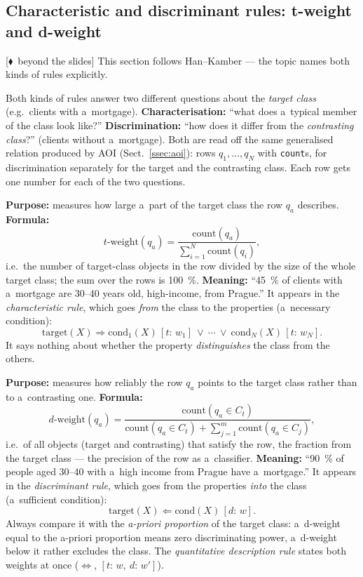 \documentclass[11pt,a4paper]{article}
\theoremstyle{definition}
\providecommand{\uv}[1]{``#1''}
\newcommand{\mimo}{\textcolor{markcol}{\textsf{\footnotesize[$\blacklozenge$~beyond the slides]}}}
\begin{document}
\subsection{Characteristic and discriminant rules: t-weight and d-weight}
\label{ssec:char-diskr}

\mimo{} This section follows Han--Kamber --- the topic names both kinds of rules
explicitly.

Both kinds of rules answer two different questions about the \emph{target class} (e.g.\
clients with a~mortgage). \textbf{Characterisation:} \uv{what does a~typical member of
the class look like?} \textbf{Discrimination:} \uv{how does it differ from the
\emph{contrasting class}?} (clients without a~mortgage). Both are read off the same
generalised relation produced by AOI (Sect.~\ref{ssec:aoi}): rows $q_1,\dots,q_N$ with
\texttt{count}s, for discrimination separately for the target and the contrasting class.
Each row gets one number for each of the two questions.

\begin{defbox}
\textbf{Purpose:} measures how large a~part of the target class the row $q_a$ describes.
\textbf{Formula:}
\[ t\text{-}\mathrm{weight}(q_a)=\frac{\mathrm{count}(q_a)}
   {\sum_{i=1}^{N}\mathrm{count}(q_i)}, \]
i.e.\ the number of target-class objects in the row divided by the size of the whole
target class; the sum over the rows is 100~\%. \textbf{Meaning:} \uv{45~\% of clients
with a~mortgage are 30--40 years old, high-income, from Prague.} It appears in the
\emph{characteristic rule}, which goes \emph{from} the class to the properties
(a~necessary condition):
\[ \mathrm{target}(X)\Rightarrow \mathrm{cond}_1(X)\,[t{:}\,w_1]\ \vee\ \cdots\ \vee\
   \mathrm{cond}_N(X)\,[t{:}\,w_N]. \]
It says nothing about whether the property \emph{distinguishes} the class from the others.
\end{defbox}

\begin{defbox}[d-weight --- discriminating power (discriminant rule)]
\textbf{Purpose:} measures how reliably the row $q_a$ points to the target class rather
than to a~contrasting one. \textbf{Formula:}
\[ d\text{-}\mathrm{weight}(q_a)=\frac{\mathrm{count}(q_a\in C_t)}
   {\mathrm{count}(q_a\in C_t)+\sum_{j=1}^{m}\mathrm{count}(q_a\in C_j)}, \]
i.e.\ of all objects (target and contrasting) that satisfy the row, the fraction from the
target class --- the precision of the row as a~classifier. \textbf{Meaning:} \uv{90~\% of
people aged 30--40 with a~high income from Prague have a~mortgage.} It appears in the
\emph{discriminant rule}, which goes from the properties \emph{into} the class
(a~sufficient condition):
\[ \mathrm{target}(X)\Leftarrow \mathrm{cond}(X)\,[d{:}\,w]. \]
Always compare it with the \emph{a-priori proportion} of the target class: a~d-weight
equal to the a-priori proportion means zero discriminating power, a~d-weight below it
rather excludes the class. The \emph{quantitative description rule} states both weights
at once ($\Leftrightarrow$, $[t{:}\,w,\ d{:}\,w']$).
\end{defbox}
\end{document}
